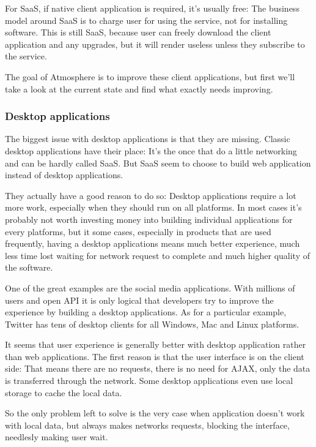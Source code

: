 For SaaS, if native client application is required, it’s usually free: The business model around SaaS is to charge user for using the service, not for installing software. This is still SaaS, because user can freely download the client application and any upgrades, but it will render useless unless they subscribe to the service.  
	
The goal of Atmosphere is to improve these client applications, but first we’ll take a look at the current state and find what exactly needs improving.  

\subsubsection{Desktop applications}

The biggest issue with desktop applications is that they are missing. Classic desktop applications have their place: It’s the once that do a little networking and can be hardly called SaaS. But SaaS seem to choose to build web application instead of desktop applications.

They actually have a good reason to do so: Desktop applications require a lot more work, especially when they should run on all platforms. In most cases it’s probably not worth investing money into building individual applications for every platforms, but it some cases, especially in products that are used frequently, having a desktop applications means much better experience, much less time lost waiting for network request to complete and much higher quality of the software.

One of the great examples are the social media applications. With millions of users and open API  it is only logical that developers try to improve the experience by building a desktop applications. As for a particular example, Twitter has tens of desktop clients for all Windows, Mac and Linux platforms.

It seems that user experience is generally better with desktop application rather than web applications. The first reason is that the user interface is on the client side: That means there are no requests, there is no need for AJAX, only the data is transferred through the network. Some desktop applications even use local storage to cache the local data.

So the only problem left to solve is the very case when application doesn’t work with local data, but always makes networks requests, blocking the interface, needlesly making user wait. 

